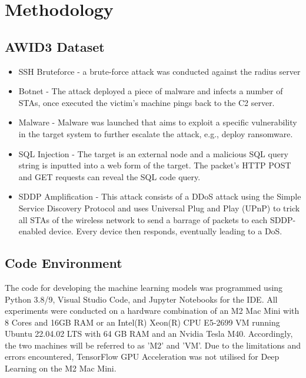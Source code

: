 
\section{Methodology}                               
\label{sec: Methodology}



\subsection{AWID3 Dataset}


\begin{itemize}
	\item SSH Bruteforce - a brute-force attack was conducted against the radius server 
	\item Botnet - The attack deployed a piece of malware and infects a number of STAs, once executed the victim's machine pings back to the C2 server. 
	\item Malware - Malware was launched that aims to exploit a specific vulnerability in the target system to further escalate the attack, e.g., deploy ransomware.
	\item SQL Injection - The target is an external node and a malicious SQL query string is inputted into a web form of the target. The packet's HTTP POST and GET requests can reveal the SQL code query.
	\item SDDP Amplification - This attack consists of a DDoS attack using the Simple Service Discovery Protocol and uses Universal Plug and Play (UPnP) to trick all STAs of the wireless network to send a barrage of packets to each SDDP-enabled device. Every device then responds, eventually leading to a DoS.
\end{itemize}

\subsection{Code Environment}

The code for developing the machine learning models was programmed using Python 3.8/9, Visual Studio Code, and Jupyter Notebooks for the IDE. All experiments were conducted on a hardware combination of an M2 Mac Mini with 8 Cores and 16GB RAM or an Intel(R) Xeon(R) CPU E5-2699 VM running Ubuntu 22.04.02 LTS with 64 GB RAM and an Nvidia Tesla M40. Accordingly, the two machines will be referred to as 'M2' and 'VM'. Due to the limitations and errors encountered, TensorFlow GPU Acceleration was not utilised for Deep Learning on the M2 Mac Mini.

